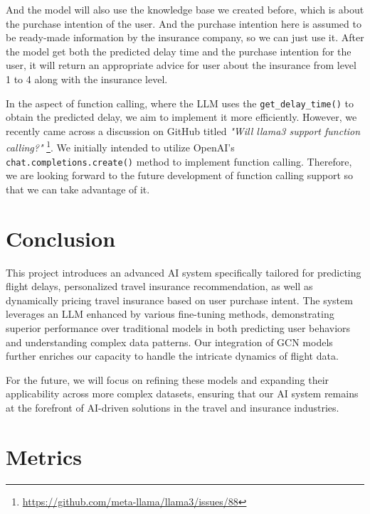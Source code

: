 \documentclass[conference]{IEEEtran}
\begin{document}
And the model will also use the knowledge base we created before, which is about the purchase intention of the user. And the purchase intention here is assumed to be ready-made information by the insurance company, so we can just use it. After the model get both the predicted delay time and the purchase intention for the user, it will return an appropriate advice for user about the insurance from level 1 to 4 along with the insurance level.


In the aspect of function calling, where the LLM uses the \verb|get_delay_time()| to obtain the predicted delay, we aim to implement it more efficiently. However, we recently came across a discussion on GitHub titled \textit{"Will llama3 support function calling?"} \footnote{\url{https://github.com/meta-llama/llama3/issues/88}}. We initially intended to utilize OpenAI's \verb|chat.completions.create()| method to implement function calling. Therefore, we are looking forward to the future development of function calling support so that we can take advantage of it.


\section{Conclusion}

This project introduces an advanced AI system specifically tailored for predicting flight delays, personalized travel insurance recommendation, as well as dynamically pricing travel insurance based on user purchase intent. The system leverages an LLM enhanced by various fine-tuning methods, demonstrating superior performance over traditional models in both predicting user behaviors and understanding complex data patterns. Our integration of GCN models further enriches our capacity to handle the intricate dynamics of flight data.

For the future, we will focus on refining these models and expanding their applicability across more complex datasets, ensuring that our AI system remains at the forefront of AI-driven solutions in the travel and insurance industries.

\newpage


\nocite{*}

\clearpage

\appendices

\section{Metrics}
\end{document}
